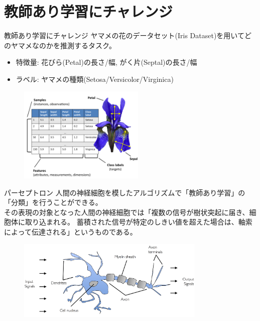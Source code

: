 \documentclass[aspectratio=169, dvipdfmx, 11pt]{beamer} %
\begin{document}
\section{教師あり学習にチャレンジ}
\begin{frame}{教師あり学習にチャレンジ}
    ヤマメの花のデータセット(Iris Dataset)を用いてどのヤマメなのかを推測するタスク。
    \begin{itemize}
        \item 特徴量: 花びら(Petal)の長さ/幅, がく片(Septal)の長さ/幅
        \item ラベル: ヤマメの種類(Setosa/Versicolor/Virginica)
    \end{itemize}
    \begin{figure}[h]
        \begin{center}
        \includegraphics[width=60mm]{img/day01/fig06.png}
        \end{center}
    \end{figure}
\end{frame}

\begin{frame}{パーセプトロン}
    人間の神経細胞を模したアルゴリズムで「教師あり学習」の「分類」を行うことができる。 \\
    その表現の対象となった人間の神経細胞では「複数の信号が樹状突起に届き、細胞体に取り込まれる。
    蓄積された信号が特定のしきい値を超えた場合は、軸索によって伝達される」というものである。
    \begin{figure}[b]
        \begin{center}
        \includegraphics[width=90mm]{img/day01/fig05.png}
        \end{center}
    \end{figure}  
\end{frame}
\end{document}
